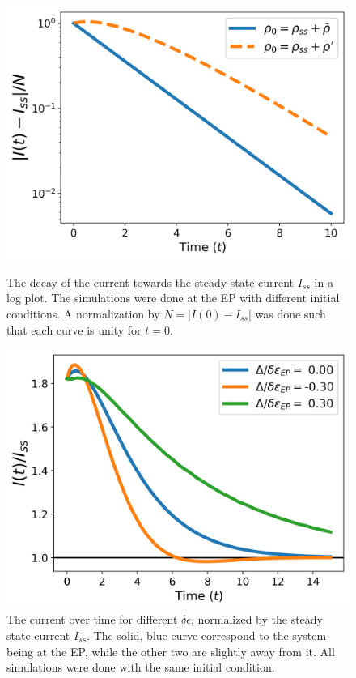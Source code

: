 \documentclass[../main.tex]{subfiles}
\begin{document}
\begin{figure}[H]
    \centering
    \begin{minipage}[t]{0.48\textwidth}
        \centering
        \includegraphics[width=\textwidth]{figures/current_diff_rho_0.png}
        \caption{The decay of the current towards the steady state current $I_{ss}$ in a log plot. The simulations were done at the EP with different initial conditions. A normalization by $N=|I(0) - I_{ss}|$ was done such that each curve is unity for $t=0$.}
    \label{fig:diffrho0}
    \end{minipage}\hfill
    \begin{minipage}[t]{0.48\textwidth}
        \centering
        \includegraphics[width=\textwidth]{figures/curr_diff_de.png}
        \caption{The current over time for different $\delta\epsilon$, normalized by the steady state current $I_{ss}$. The solid, blue curve correspond to the system being at the EP, while the other two are slightly away from it. All simulations were done with the same initial condition.}
    \label{fig:diffde}
    \end{minipage}\hfill
\end{figure}
\end{document}
